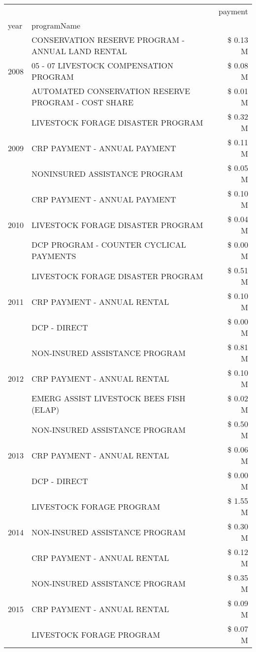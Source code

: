 \begin{tabular}{llr}
\toprule
 &  & payment \\
year & programName &  \\
\midrule
\multirow[t]{3}{*}{2008} & CONSERVATION RESERVE PROGRAM - ANNUAL LAND RENTAL & \$ 0.13 M \\
 & 05 - 07 LIVESTOCK COMPENSATION PROGRAM & \$ 0.08 M \\
 & AUTOMATED CONSERVATION RESERVE PROGRAM - COST SHARE & \$ 0.01 M \\
\cline{1-3}
\multirow[t]{3}{*}{2009} & LIVESTOCK FORAGE DISASTER  PROGRAM & \$ 0.32 M \\
 & CRP PAYMENT - ANNUAL PAYMENT & \$ 0.11 M \\
 & NONINSURED ASSISTANCE PROGRAM & \$ 0.05 M \\
\cline{1-3}
\multirow[t]{3}{*}{2010} & CRP PAYMENT - ANNUAL PAYMENT & \$ 0.10 M \\
 & LIVESTOCK FORAGE DISASTER  PROGRAM & \$ 0.04 M \\
 & DCP PROGRAM - COUNTER CYCLICAL PAYMENTS & \$ 0.00 M \\
\cline{1-3}
\multirow[t]{3}{*}{2011} & LIVESTOCK FORAGE DISASTER PROGRAM & \$ 0.51 M \\
 & CRP PAYMENT - ANNUAL RENTAL & \$ 0.10 M \\
 & DCP - DIRECT & \$ 0.00 M \\
\cline{1-3}
\multirow[t]{3}{*}{2012} & NON-INSURED ASSISTANCE PROGRAM & \$ 0.81 M \\
 & CRP PAYMENT - ANNUAL RENTAL & \$ 0.10 M \\
 & EMERG ASSIST LIVESTOCK BEES FISH (ELAP) & \$ 0.02 M \\
\cline{1-3}
\multirow[t]{3}{*}{2013} & NON-INSURED ASSISTANCE PROGRAM & \$ 0.50 M \\
 & CRP PAYMENT - ANNUAL RENTAL & \$ 0.06 M \\
 & DCP - DIRECT & \$ 0.00 M \\
\cline{1-3}
\multirow[t]{3}{*}{2014} & LIVESTOCK FORAGE PROGRAM & \$ 1.55 M \\
 & NON-INSURED ASSISTANCE PROGRAM & \$ 0.30 M \\
 & CRP PAYMENT - ANNUAL RENTAL & \$ 0.12 M \\
\cline{1-3}
\multirow[t]{3}{*}{2015} & NON-INSURED ASSISTANCE PROGRAM & \$ 0.35 M \\
 & CRP PAYMENT - ANNUAL RENTAL & \$ 0.09 M \\
 & LIVESTOCK FORAGE PROGRAM & \$ 0.07 M \\

\end{tabular}
